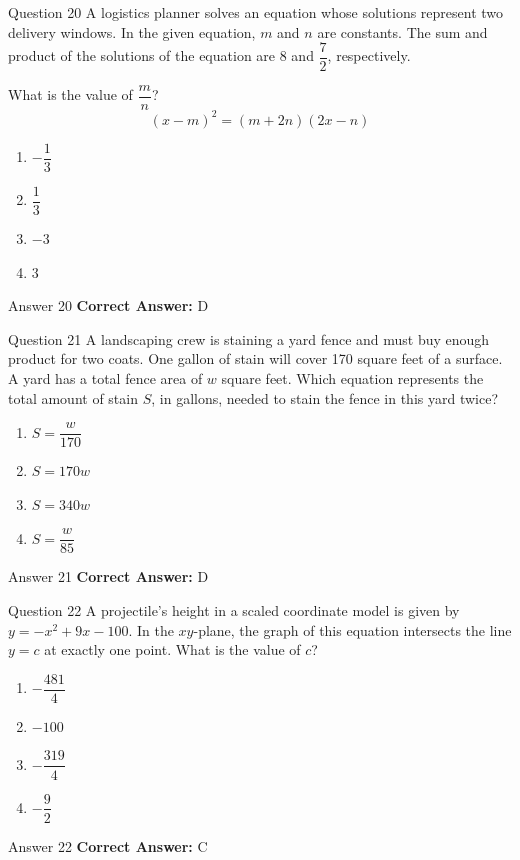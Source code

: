 \documentclass{beamer}
\begin{document}
\begin{frame}{Question 20}
\small
A logistics planner solves an equation whose solutions represent two delivery windows. In the given equation, \(m\) and \(n\) are constants. The sum and product of the solutions of the equation are 8 and \(\dfrac{7}{2}\), respectively.

What is the value of \(\dfrac{m}{n}\)?
\[
(x - m)^2 = (m + 2n)(2x - n)
\]
\vspace{0.35cm}
\begin{enumerate}
    \item[A.] \(-\dfrac{1}{3}\)
    \item[B.] \(\dfrac{1}{3}\)
    \item[C.] \(-3\)
    \item[D.] \(3\)
\end{enumerate}
\end{frame}
\begin{frame}{Answer 20}
\small
\textbf{Correct Answer:} D
\end{frame}

\begin{frame}{Question 21}
\small
A landscaping crew is staining a yard fence and must buy enough product for two coats. One gallon of stain will cover 170 square feet of a surface. A yard has a total fence area of \(w\) square feet.
Which equation represents the total amount of stain \(S\), in gallons, needed to stain the fence in this yard twice?
\vspace{0.35cm}
\begin{enumerate}
    \item[A.] \(S = \dfrac{w}{170}\)
    \item[B.] \(S = 170w\)
    \item[C.] \(S = 340w\)
    \item[D.] \(S = \dfrac{w}{85}\)
\end{enumerate}
\end{frame}
\begin{frame}{Answer 21}
\small
\textbf{Correct Answer:} D
\end{frame}

\begin{frame}{Question 22}
\small
A projectile’s height in a scaled coordinate model is given by \(y = -x^2 + 9x - 100\). In the \(xy\)-plane, the graph of this equation intersects the line \(y = c\) at exactly one point. What is the value of \(c\)?
\vspace{0.35cm}
\begin{enumerate}
    \item[A.] \(-\dfrac{481}{4}\)
    \item[B.] \(-100\)
    \item[C.] \(-\dfrac{319}{4}\)
    \item[D.] \(-\dfrac{9}{2}\)
\end{enumerate}
\end{frame}
\begin{frame}{Answer 22}
\small
\textbf{Correct Answer:} C
\end{frame}
\end{document}
